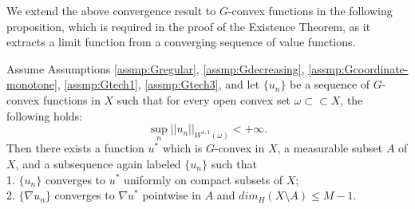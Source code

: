 {We extend the above convergence result to $G$-convex functions in the following proposition, which is required in the proof of the Existence Theorem, as it extracts a limit function from a converging sequence of value functions.}

\begin{proposition}\label{proposition:convergence}
	Assume Assumptions \ref{assmp:Gregular}, \ref{assmp:Gdecreasing}, \ref{assmp:Gcoordinate-monotone}, \ref{assmp:Gtech1}, \ref{assmp:Gtech3}, and let $\{u_n\}$ be a sequence of $G$-convex functions in $X$ such that for every open convex set $\omega \subset \subset X$, the following holds:
	\begin{equation*}
	\sup\limits_{n} ||u_n||_{W^{1,1}(\omega )} < +\infty.
	\end{equation*}
	Then there exists a function $u^*$ which is  $G$-convex in $X$, a measurable subset $A$ of $X$, and a subsequence again labeled $\{u_n\}$ such that\\
	1. $\{u_n\}$ converges to $u^*$ uniformly on compact subsets of $X$;\\
	2. $\{\nabla u_n\}$ converges to $\nabla u^*$ pointwise in $A$ and $dim_{H}(X\setminus A)\le M-1$.
\end{proposition}

